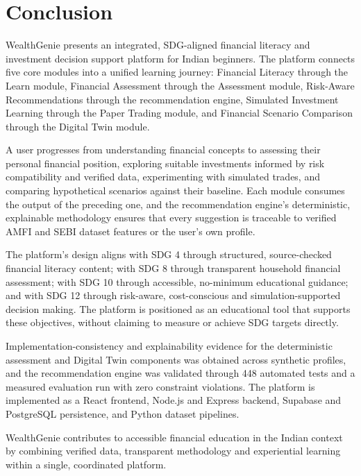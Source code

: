 \section{Conclusion}

WealthGenie presents an integrated, SDG-aligned financial literacy and investment decision support platform for Indian beginners. The platform connects five core modules into a unified learning journey: Financial Literacy through the Learn module, Financial Assessment through the Assessment module, Risk-Aware Recommendations through the recommendation engine, Simulated Investment Learning through the Paper Trading module, and Financial Scenario Comparison through the Digital Twin module.

A user progresses from understanding financial concepts to assessing their personal financial position, exploring suitable investments informed by risk compatibility and verified data, experimenting with simulated trades, and comparing hypothetical scenarios against their baseline. Each module consumes the output of the preceding one, and the recommendation engine's deterministic, explainable methodology ensures that every suggestion is traceable to verified AMFI and SEBI dataset features or the user's own profile.

The platform's design aligns with SDG 4 through structured, source-checked financial literacy content; with SDG 8 through transparent household financial assessment; with SDG 10 through accessible, no-minimum educational guidance; and with SDG 12 through risk-aware, cost-conscious and simulation-supported decision making. The platform is positioned as an educational tool that supports these objectives, without claiming to measure or achieve SDG targets directly.

Implementation-consistency and explainability evidence for the deterministic assessment and Digital Twin components was obtained across synthetic profiles, and the recommendation engine was validated through 448 automated tests and a measured evaluation run with zero constraint violations. The platform is implemented as a React frontend, Node.js and Express backend, Supabase and PostgreSQL persistence, and Python dataset pipelines.

WealthGenie contributes to accessible financial education in the Indian context by combining verified data, transparent methodology and experiential learning within a single, coordinated platform.
